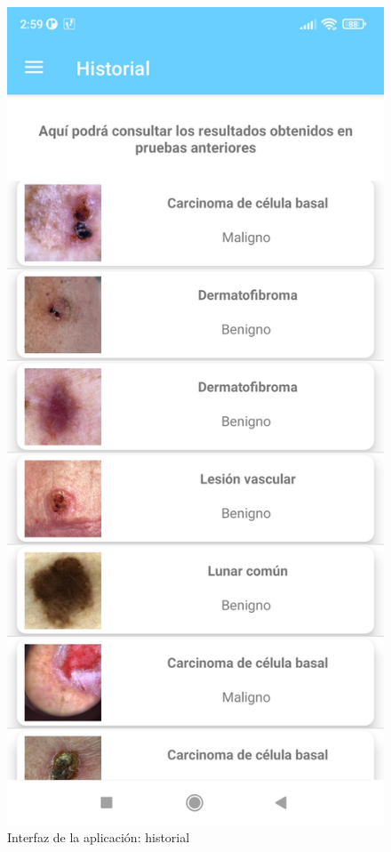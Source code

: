       \begin{figure}[H]
 	\centering
 	\includegraphics[scale = 0.125]{imagenes/historialapp.jpg}
 	\caption{Interfaz de la aplicación: historial}
 	\label{fig:historial}
 \end{figure}